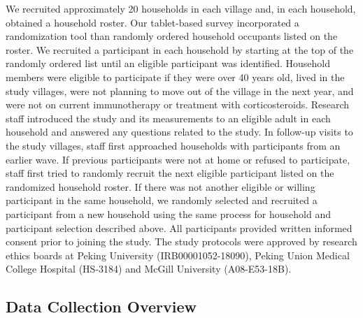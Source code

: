 \documentclass[
  letterpaper,
  DIV=11,
  numbers=noendperiod]{scrartcl}
\begin{document}
We recruited approximately 20 households in each village and, in each
household, obtained a household roster. Our tablet-based
survey incorporated a randomization tool than randomly ordered household
occupants listed on the roster. We recruited a participant in each
household by starting at the top of the randomly ordered list until an
eligible participant was identified. Household members were eligible to
participate if they were over 40 years old, lived in the study villages,
were not planning to move out of the village in the next year, and were
not on current immunotherapy or treatment with corticosteroids. Research
staff introduced the study and its measurements to an eligible adult in
each household and answered any questions related to the study. In
follow-up visits to the study villages, staff first approached
households with participants from an earlier wave. If previous
participants were not at home or refused to participate, staff first
tried to randomly recruit the next eligible participant listed on the
randomized household roster. If there was not another
eligible or willing participant in the same household, we randomly
selected and recruited a participant from a new household using the same
process for household and participant selection described above. All
participants provided written informed consent prior to joining the
study. The study protocols were approved by research ethics boards at
Peking University (IRB00001052-18090), Peking Union Medical College
Hospital (HS-3184) and McGill University (A08-E53-18B).

\subsection{Data Collection Overview}\label{data-collection-overview}
\end{document}
